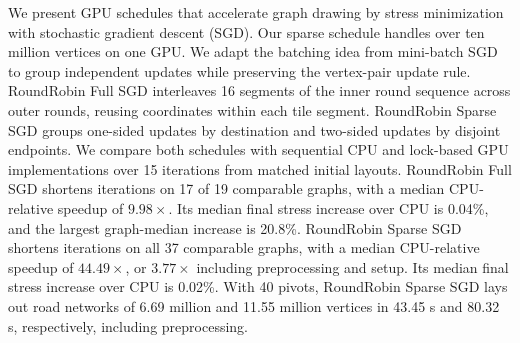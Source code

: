We present GPU schedules that accelerate graph drawing by stress minimization with stochastic gradient descent (SGD). Our sparse schedule handles over ten million vertices on one GPU.
We adapt the batching idea from mini-batch SGD to group independent updates while preserving the vertex-pair update rule.
RoundRobin Full SGD interleaves 16 segments of the inner round sequence across outer rounds, reusing coordinates within each tile segment. RoundRobin Sparse SGD groups one-sided updates by destination and two-sided updates by disjoint endpoints.
We compare both schedules with sequential CPU and lock-based GPU implementations over 15 iterations from matched initial layouts.
RoundRobin Full SGD shortens iterations on 17 of 19 comparable graphs, with a median CPU-relative speedup of $9.98\times$. Its median final stress increase over CPU is 0.04\%, and the largest graph-median increase is 20.8\%.
RoundRobin Sparse SGD shortens iterations on all 37 comparable graphs, with a median CPU-relative speedup of $44.49\times$, or $3.77\times$ including preprocessing and setup. Its median final stress increase over CPU is 0.02\%.
With 40 pivots, RoundRobin Sparse SGD lays out road networks of 6.69 million and 11.55 million vertices in 43.45 s and 80.32 s, respectively, including preprocessing.
